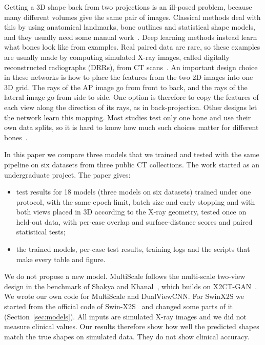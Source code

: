 \documentclass[11pt]{article}
\begin{document}
Getting a 3D shape back from two projections is an ill-posed problem, because many different volumes give the same pair of images. Classical methods deal with this by using anatomical landmarks, bone outlines and statistical shape models, and they usually need some manual work~\cite{laporte2003,zheng2009,baka2011,karade2015}. Deep learning methods instead learn what bones look like from examples. Real paired data are rare, so these examples are usually made by computing simulated X-ray images, called digitally reconstructed radiographs (DRRs), from CT scans~\cite{ying2019,kasten2020,bayat2020,shakya2023,liuk2025}. An important design choice in these networks is how to place the features from the two 2D images into one 3D grid. The rays of the AP image go from front to back, and the rays of the lateral image go from side to side. One option is therefore to copy the features of each view along the direction of its rays, as in back-projection. Other designs let the network learn this mapping. Most studies test only one bone and use their own data splits, so it is hard to know how much such choices matter for different bones~\cite{shakya2023}.

In this paper we compare three models that we trained and tested with the same pipeline on six datasets from three public CT collections. The work started as an undergraduate project. The paper gives:
\begin{itemize}
\item test results for 18 models (three models on six datasets) trained under one protocol, with the same epoch limit, batch size and early stopping and with both views placed in 3D according to the X-ray geometry, tested once on held-out data, with per-case overlap and surface-distance scores and paired statistical tests;
\item the trained models, per-case test results, training logs and the scripts that make every table and figure.
\end{itemize}

We do not propose a new model. MultiScale follows the multi-scale two-view design in the benchmark of Shakya and Khanal~\cite{shakya2023}, which builds on X2CT-GAN~\cite{ying2019}. We wrote our own code for MultiScale and DualViewCNN. For SwinX2S we started from the official code of Swin-X2S~\cite{liuk2025} and changed some parts of it (Section~\ref{sec:models}). All inputs are simulated X-ray images and we did not measure clinical values. Our results therefore show how well the predicted shapes match the true shapes on simulated data. They do not show clinical accuracy.
\end{document}
